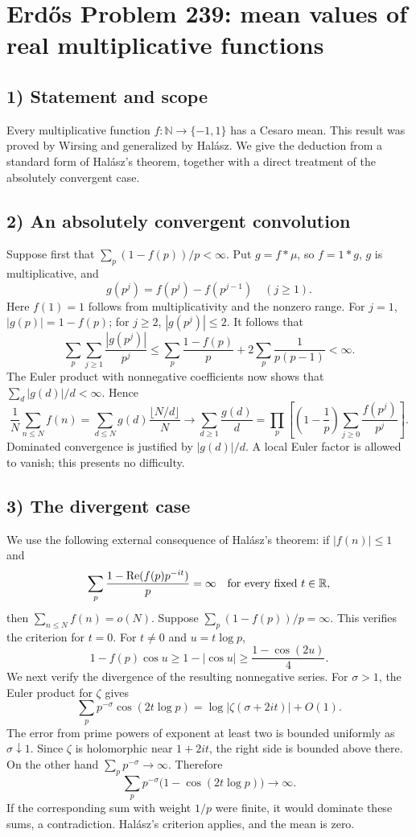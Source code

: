 \section{Erd\H{o}s Problem 239: mean values of real multiplicative functions}

\subsection{1) Statement and scope}
Every multiplicative function $f:\mathbb N\to\{-1,1\}$ has a
Cesaro mean. This result was proved by Wirsing and generalized
by Hal\'asz. We give the deduction from a standard form of
Hal\'asz's theorem, together with a direct treatment of the
absolutely convergent case.

\subsection{2) An absolutely convergent convolution}
Suppose first that $\sum_p(1-f(p))/p<\infty$. Put $g=f*\mu$,
so $f=1*g$, $g$ is multiplicative, and
\[
 g(p^j)=f(p^j)-f(p^{j-1})\quad(j\geq1).
\]
Here $f(1)=1$ follows from multiplicativity and the nonzero
range. For $j=1$, $|g(p)|=1-f(p)$; for $j\geq2$, $|g(p^j)|\leq2$.
It follows that
\[
 \sum_p\sum_{j\geq1}\frac{|g(p^j)|}{p^j}
 \leq\sum_p\frac{1-f(p)}p+
       2\sum_p\frac1{p(p-1)}<\infty.
\]
The Euler product with nonnegative coefficients now shows that
$\sum_d|g(d)|/d<\infty$. Hence
\[
 \frac1N\sum_{n\leq N}f(n)
   =\sum_{d\leq N}g(d)\frac{\lfloor N/d\rfloor}{N}
   \longrightarrow\sum_{d\geq1}\frac{g(d)}d
   =\prod_p\left[\left(1-\frac1p\right)
      \sum_{j\geq0}\frac{f(p^j)}{p^j}\right].
\]
Dominated convergence is justified by $|g(d)|/d$. A local
Euler factor is allowed to vanish; this presents no difficulty.

\subsection{3) The divergent case}
We use the following external consequence of Hal\'asz's theorem:
if $|f(n)|\leq1$ and
\[
 \sum_p\frac{1-\operatorname{Re}(f(p)p^{-it})}{p}=\infty
       \quad\hbox{for every fixed }t\in\mathbb R,
\]
then $\sum_{n\leq N}f(n)=o(N)$.
Suppose $\sum_p(1-f(p))/p=\infty$. This verifies the criterion
for $t=0$. For $t\ne0$ and $u=t\log p$,
\[
 1-f(p)\cos u\geq1-|\cos u|
       \geq\frac{1-\cos(2u)}4.
\]
We next verify the divergence of the resulting nonnegative series.
For $\sigma>1$, the Euler product for $\zeta$ gives
\[
 \sum_p p^{-\sigma}\cos(2t\log p)
       =\log|\zeta(\sigma+2it)|+O(1).
\]
The error from prime powers of exponent at least two is bounded
uniformly as $\sigma\downarrow1$. Since $\zeta$ is holomorphic
near $1+2it$, the right side is bounded above there.
On the other hand $\sum_p p^{-\sigma}\to\infty$. Therefore
\[
 \sum_p p^{-\sigma}\bigl(1-\cos(2t\log p)\bigr)\longrightarrow\infty.
\]
If the corresponding sum with weight $1/p$ were finite, it
would dominate these sums, a contradiction. Hal\'asz's criterion
applies, and the mean is zero.

